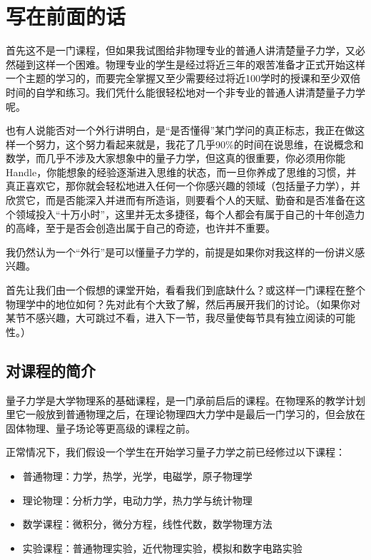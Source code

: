 \section{写在前面的话}

首先这不是一门课程，但如果我试图给非物理专业的普通人讲清楚量子力学，又必然碰到这样一个困难。物理专业的学生是经过将近三年的艰苦准备才正式开始这样一个主题的学习的，而要完全掌握又至少需要经过将近100学时的授课和至少双倍时间的自学和练习。我们凭什么能很轻松地对一个非专业的普通人讲清楚量子力学呢。

也有人说能否对一个外行讲明白，是“是否懂得”某门学问的真正标志，我正在做这样一个努力，这个努力看起来就是，我花了几乎90\%的时间在说思维，在说概念和数学，而几乎不涉及大家想象中的量子力学，但这真的很重要，你必须用你能Handle，你能想象的经验逐渐进入思维的状态，而一旦你养成了思维的习惯，并真正喜欢它，那你就会轻松地进入任何一个你感兴趣的领域（包括量子力学），并欣赏它，而是否能深入并进而有所造诣，则要看个人的天赋、勤奋和是否准备在这个领域投入“十万小时”，这里并无太多捷径，每个人都会有属于自己的十年创造力的高峰，至于是否会创造出属于自己的奇迹，也许并不重要。

我仍然认为一个“外行”是可以懂量子力学的，前提是如果你对我这样的一份讲义感兴趣。

首先让我们由一个假想的课堂开始，看看我们到底缺什么？或这样一门课程在整个物理学中的地位如何？先对此有个大致了解，然后再展开我们的讨论。（如果你对某节不感兴趣，大可跳过不看，进入下一节，我尽量使每节具有独立阅读的可能性。）

\subsection{对课程的简介}

量子力学是大学物理系的基础课程，是一门承前启后的课程。在物理系的教学计划里它一般放到普通物理之后，在理论物理四大力学中是最后一门学习的，但会放在固体物理、量子场论等更高级的课程之前。

正常情况下，我们假设一个学生在开始学习量子力学之前已经修过以下课程：

\begin{itemize}

\item 普通物理：力学，热学，光学，电磁学，原子物理学

\item 理论物理：分析力学，电动力学，热力学与统计物理 
 
\item 数学课程：微积分，微分方程，线性代数，数学物理方法 
 
\item 实验课程：普通物理实验，近代物理实验，模拟和数字电路实验

\end{itemize}

